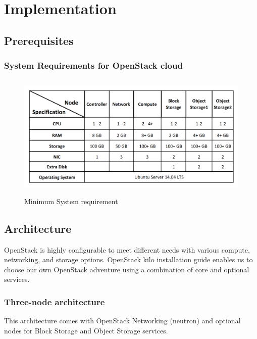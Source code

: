 \chapter{Implementation}

    \section{Prerequisites}
        \subsection{System Requirements for OpenStack cloud}
        \begin{figure}[h]
             \centering
            \includegraphics[height=6cm,width=13cm]{images/hw.png}
            \caption{Minimum System requirement} %
        \end{figure}

\section{Architecture}
    \par OpenStack is highly configurable to meet different needs with various compute, networking, and storage options. OpenStack kilo installation guide enables us to choose our own OpenStack adventure using a combination of core and optional services.
    
    \subsection{Three-node architecture}
    \par This architecture comes with OpenStack Networking (neutron) and optional nodes for Block Storage and Object Storage services.
    
